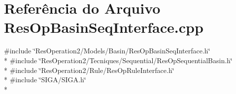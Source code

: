 \section{Referência do Arquivo Res\+Op\+Basin\+Seq\+Interface.\+cpp}
\label{_res_op_basin_seq_interface_8cpp}
{\ttfamily \#include \char`\"{}Res\+Operation2/\+Models/\+Basin/\+Res\+Op\+Basin\+Seq\+Interface.\+h\char`\"{}}\\*
{\ttfamily \#include \char`\"{}Res\+Operation2/\+Tecniques/\+Sequential/\+Res\+Op\+Sequential\+Basin.\+h\char`\"{}}\\*
{\ttfamily \#include \char`\"{}Res\+Operation2/\+Rule/\+Res\+Op\+Rule\+Interface.\+h\char`\"{}}\\*
{\ttfamily \#include \char`\"{}S\+I\+G\+A/\+S\+I\+G\+A.\+h\char`\"{}}\\*
